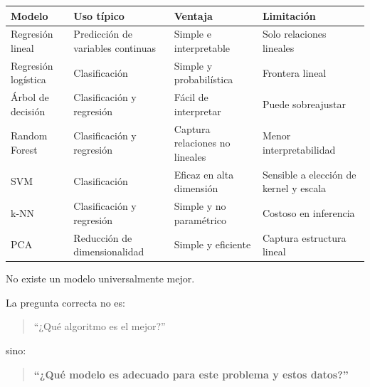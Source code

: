 \documentclass[
  letterpaper,
  DIV=11,
  numbers=noendperiod]{scrartcl}
\newcounter{none} %
\begin{document}
{\def\LTcaptype{none} %
\begin{longtable}[]{@{}
  >{\raggedright\arraybackslash}p{}
  >{\raggedright\arraybackslash}p{}
  >{\raggedright\arraybackslash}p{}
  >{\raggedright\arraybackslash}p{}@{}}
\toprule\noalign{}
\begin{minipage}[b]{\linewidth}\raggedright
Modelo
\end{minipage} & \begin{minipage}[b]{\linewidth}\raggedright
Uso típico
\end{minipage} & \begin{minipage}[b]{\linewidth}\raggedright
Ventaja
\end{minipage} & \begin{minipage}[b]{\linewidth}\raggedright
Limitación
\end{minipage} \\
\midrule\noalign{}
\endhead
\bottomrule\noalign{}
\endlastfoot
Regresión lineal & Predicción de variables continuas & Simple e
interpretable & Solo relaciones lineales \\
Regresión logística & Clasificación & Simple y probabilística & Frontera
lineal \\
Árbol de decisión & Clasificación y regresión & Fácil de interpretar &
Puede sobreajustar \\
Random Forest & Clasificación y regresión & Captura relaciones no
lineales & Menor interpretabilidad \\
SVM & Clasificación & Eficaz en alta dimensión & Sensible a elección de
kernel y escala \\
k-NN & Clasificación y regresión & Simple y no paramétrico & Costoso en
inferencia \\
PCA & Reducción de dimensionalidad & Simple y eficiente & Captura
estructura lineal \\
\end{longtable}
}

No existe un modelo universalmente mejor.

La pregunta correcta no es:

\begin{quote}
``¿Qué algoritmo es el mejor?''
\end{quote}

sino:

\begin{quote}
\textbf{``¿Qué modelo es adecuado para este problema y estos datos?''}
\end{quote}
\end{document}
